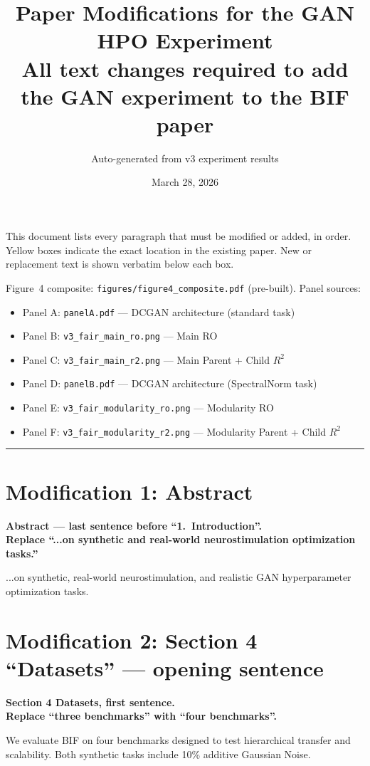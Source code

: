\documentclass[11pt]{article}
\title{Paper Modifications for the GAN HPO Experiment\\
\large All text changes required to add the GAN experiment to the BIF paper}
\author{Auto-generated from v3 experiment results}
\date{March 28, 2026}
\newcommand{\modloc}[1]{\noindent\colorbox{yellow!30}{\parbox{\dimexpr\textwidth-2\fboxsep}{%
\textbf{#1}}}\medskip}
\begin{document}
\maketitle

\noindent This document lists every paragraph that must be modified or added, in order.
Yellow boxes indicate the exact location in the existing paper.
New or replacement text is shown verbatim below each box.

Figure~4 composite: \texttt{figures/figure4\_composite.pdf} (pre-built).
Panel sources:
\begin{itemize}[nosep]
\item Panel A: \texttt{panelA.pdf} --- DCGAN architecture (standard task)
\item Panel B: \texttt{v3\_fair\_main\_ro.png} --- Main RO
\item Panel C: \texttt{v3\_fair\_main\_r2.png} --- Main Parent + Child $R^2$
\item Panel D: \texttt{panelB.pdf} --- DCGAN architecture (SpectralNorm task)
\item Panel E: \texttt{v3\_fair\_modularity\_ro.png} --- Modularity RO
\item Panel F: \texttt{v3\_fair\_modularity\_r2.png} --- Modularity Parent + Child $R^2$
\end{itemize}

\bigskip\hrule\bigskip

\section*{Modification 1: Abstract}
\modloc{Abstract --- last sentence before ``1.\ Introduction''.\\
Replace ``...on synthetic and real-world neurostimulation optimization tasks.''}

...on synthetic, real-world neurostimulation, and realistic GAN hyperparameter
optimization tasks.

\section*{Modification 2: Section 4 ``Datasets'' --- opening sentence}
\modloc{Section 4 Datasets, first sentence.\\
Replace ``three benchmarks'' with ``four benchmarks''.}

We evaluate BIF on four benchmarks designed to test hierarchical
transfer and scalability. Both synthetic tasks include 10\% additive
Gaussian Noise.
\end{document}
